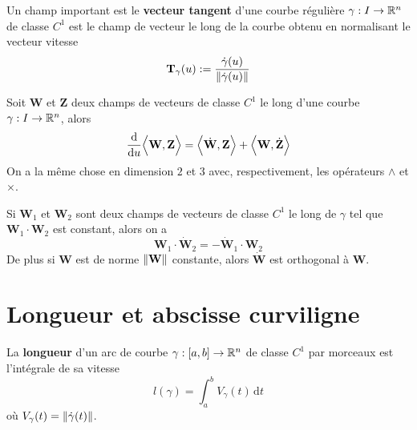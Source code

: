 \begin{exemple}
	Un champ important est le \textbf{vecteur tangent} d'une courbe régulière $\gamma : I \to \mathbb{R}^n$ de classe $C^1$ est le champ de vecteur le long de la courbe obtenu en normalisant le vecteur vitesse
	\[
	\mathbf{T}_\gamma(u) := \frac{\dot \gamma(u)}{\left\| \dot \gamma(u) \right\|}
	\]
\end{exemple}

\begin{lemme} \label{lem: Règle de Leibnitz}
	Soit $\bm W$ et $\bm Z$ deux champs de vecteurs de classe $C^1$ le long d'une courbe $\gamma : I \to \mathbb{R}^n$, alors
	\[
	\frac{\mathrm d }{\mathrm du} \Big\langle \mathbf{W}, \mathbf{Z} \Big \rangle = \Big \langle \dot{\mathbf{W}}, \mathbf{Z} \Big \rangle + \Big \langle \mathbf{W}, \dot{\mathbf{Z}} \Big \rangle
	\]
	On a la même chose en dimension $2$ et $3$ avec, respectivement, les opérateurs $\land$ et $\times$.
\end{lemme}


\begin{corollaire} \label{cor: invariance permuatation de la dérivée à signe près}
	Si $\bm W_1$ et $\bm W_2$ sont deux champs de vecteurs de classe $C^1$ le long de $\gamma$ tel que $\bm W_1 \cdot \bm W_2$ est constant, alors on a
	\[
	\bm W_1 \cdot \dot{\bm W}_2 = - \dot{\bm W}_1 \cdot \bm W_2
	\]
	De plus si $\bm W$ est de norme $\left\| \mathbf{W} \right\|$ constante, alors $\dot{\bm W}$ est orthogonal à $\bm W$.
\end{corollaire}

\section{Longueur et abscisse curviligne}

\begin{definition}
	La \textbf{longueur} d'un arc de courbe $\gamma : [a,b] \to \mathbb{R}^n$ de classe $C^1$ par morceaux est l'intégrale de sa vitesse
	\[
	l(\gamma) = \int_a^b V_\gamma(t) \, \mathrm dt
	\]
	où $V_\gamma(t) = \left\| \dot \gamma(t) \right\|$.
\end{definition}

